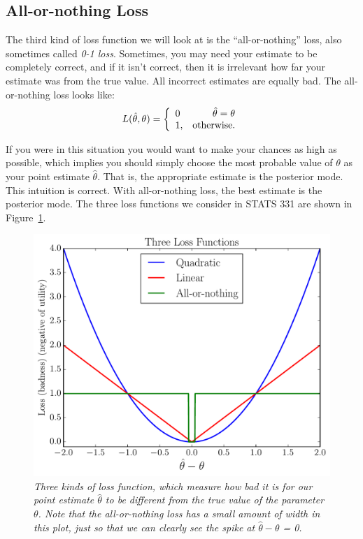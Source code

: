 \subsection{All-or-nothing Loss}
The third kind of loss function we will look at is the ``all-or-nothing'' loss,
also sometimes called {\it 0-1 loss}.
Sometimes, you may need your estimate to be
completely correct, and if it isn't correct, then it is irrelevant how far your
estimate was from the true value. All incorrect estimates are equally bad.
The all-or-nothing loss looks like:
\begin{eqnarray}
L(\hat{\theta}, \theta) = \left\{
\begin{array}{lr}
0 & \hat{\theta} = \theta\\
1, & \textnormal{otherwise.}
\end{array}
\right.
\end{eqnarray}

If you were in this situation you would want to make your chances as high as
possible, which implies you should simply choose the most probable value
of $\theta$ as your point estimate $\hat{\theta}$. That is, the appropriate
estimate is the posterior mode. This intuition is correct. With all-or-nothing loss,
the best estimate is the posterior mode. The three loss functions we consider
in STATS 331 are shown in Figure~\ref{fig:utility}.

\begin{figure}[!ht]
\begin{center}
\includegraphics[scale=0.5]{Figures/utility.pdf}
\caption{\it Three kinds of loss function, which measure how bad it is for our
point estimate $\hat{\theta}$ to be different from the true value of the parameter
$\theta$. Note that the all-or-nothing loss has a small amount of width in this
plot, just so that we can clearly see the spike at
$\hat{\theta} - \theta$ = 0.\label{fig:utility}}
\end{center}
\end{figure}

